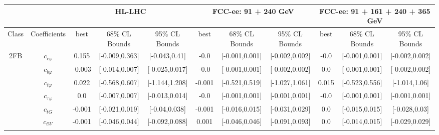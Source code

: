 \documentclass{article}
\begin{document}
\begin{table}[H]
\centering
\begin{tabular}{|c|c|c|c|c|c|c|c|c|c|c|}
\hline
 &  & \multicolumn{3}{c|}{HL-LHC} & \multicolumn{3}{c|}{FCC-ee: 91 + 240 GeV} & \multicolumn{3}{c|}{FCC-ee: 91 + 161 + 240 + 365 GeV} \\ \hline
Class & Coefficients & best & 68\% CL Bounds & 95\% CL Bounds & best & 68\% CL Bounds & 95\% CL Bounds & best & 68\% CL Bounds & 95\% CL Bounds\\ \hline
\multirow{23}{*}{2FB}
 & $c_{c \varphi}$ & 0.155                             & [-0.009,0.363]                                 & [-0.043,0.41] & -0.0                             & [-0.001,0.001]                                 & [-0.002,0.002] & -0.0                             & [-0.001,0.001]                                 & [-0.002,0.002] \\ \cline{2-11}
 & $c_{b \varphi}$ & -0.003                             & [-0.014,0.007]                                 & [-0.025,0.017] & -0.0                             & [-0.001,0.001]                                 & [-0.002,0.002] & 0.0                             & [-0.001,0.001]                                 & [-0.002,0.002] \\ \cline{2-11}
 & $c_{t \varphi}$ & 0.022                             & [-0.568,0.607]                                 & [-1.144,1.208] & -0.001                             & [-0.521,0.519]                                 & [-1.027,1.061] & 0.015                             & [-0.523,0.556]                                 & [-1.014,1.06] \\ \cline{2-11}
 & $c_{\tau \varphi}$ & 0.0                             & [-0.007,0.007]                                 & [-0.013,0.014] & -0.0                             & [-0.001,0.001]                                 & [-0.001,0.001] & -0.0                             & [-0.001,0.001]                                 & [-0.001,0.001] \\ \cline{2-11}
 & $c_{tG}$ & -0.001                             & [-0.021,0.019]                                 & [-0.04,0.038] & -0.001                             & [-0.016,0.015]                                 & [-0.031,0.029] & 0.0                             & [-0.015,0.015]                                 & [-0.028,0.03] \\ \cline{2-11}
 & $c_{tW}$ & -0.001                             & [-0.046,0.044]                                 & [-0.092,0.088] & 0.001                             & [-0.046,0.046]                                 & [-0.091,0.093] & 0.0                             & [-0.014,0.015]                                 & [-0.029,0.029] \\ \cline{2-11}

\end{tabular}
\end{table}
\end{document}

